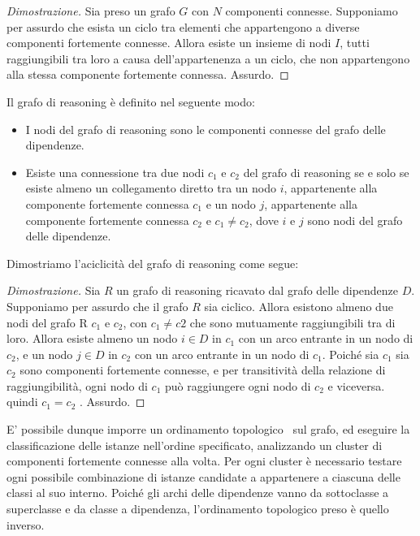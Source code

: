 \begin{proof}[Dimostrazione]
Sia preso un grafo $G$ con $N$ componenti connesse.
Supponiamo per assurdo che esista un ciclo tra elementi che appartengono a diverse componenti fortemente connesse.
Allora esiste un insieme di nodi $I$, tutti raggiungibili tra loro a causa dell'appartenenza a un ciclo, che non appartengono alla stessa componente fortemente connessa. Assurdo.
\end{proof}

Il grafo di reasoning è definito nel seguente modo:

\begin{itemize}
 \item I nodi del grafo di reasoning sono le componenti connesse del grafo delle dipendenze.
 \item Esiste una connessione tra due nodi $c_1$ e $c_2$ del grafo di reasoning  se e solo se esiste almeno un collegamento diretto tra un nodo $i$, appartenente alla componente fortemente connessa $c_1$ e un nodo $j$, appartenente alla componente fortemente connessa $c_2$ e $c_1\neq c_2$, dove $i$ e $j$ sono nodi del grafo delle dipendenze.
\end{itemize}

Dimostriamo l'aciclicità del grafo di reasoning come segue:

\begin{proof}[Dimostrazione]
Sia $R$ un grafo di reasoning ricavato dal grafo delle dipendenze $D$.
Supponiamo per assurdo che il grafo $R$ sia ciclico. Allora esistono almeno due nodi del grafo R $c_1$ e $c_2$, con $c_1\neq c2$ che sono mutuamente raggiungibili tra di loro. 
Allora esiste almeno un nodo $i\in D$ in $c_1$ con un arco entrante in un nodo di $c_2$, e un nodo $j\in D$ in $c_2$ con un arco entrante in un nodo di $c_1$. Poiché sia $c_1$ sia $c_2$ sono componenti fortemente connesse, e per transitività della relazione di raggiungibilità, ogni nodo di $c_1$ può raggiungere ogni nodo di $c_2$ e viceversa. quindi $c_1=c_2$ . Assurdo.
\end{proof}

E' possibile dunque imporre un ordinamento topologico~\cite{Kahn:1962:TSL:368996.369025} sul grafo, ed eseguire la classificazione delle istanze nell'ordine specificato, analizzando un cluster di componenti fortemente connesse alla volta. Per ogni cluster è necessario testare ogni possibile combinazione di istanze candidate a appartenere a ciascuna delle classi al suo interno. Poiché gli archi delle dipendenze vanno da sottoclasse a superclasse e da classe a dipendenza, l'ordinamento topologico preso è quello inverso.

